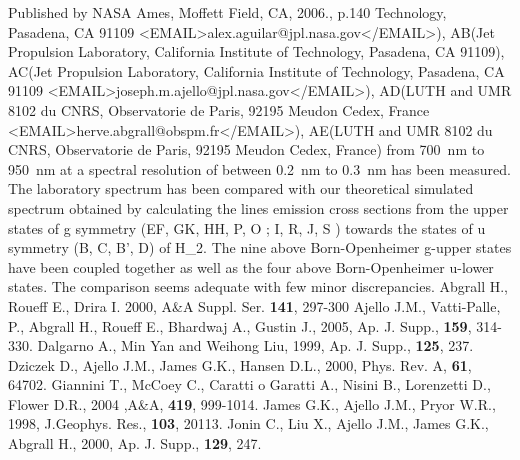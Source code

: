 {{{{{{{{{{{{{{\begin{references}
Published by NASA Ames, Moffett Field, CA, 2006., p.140
Technology, Pasadena, CA 91109 <EMAIL>alex.aguilar@jpl.nasa.gov</EMAIL>),
AB(Jet Propulsion Laboratory, California Institute of
Technology, Pasadena, CA 91109),
AC(Jet Propulsion Laboratory, California Institute of
Technology, Pasadena, CA 91109 <EMAIL>joseph.m.ajello@jpl.nasa.gov</EMAIL>),
AD(LUTH and UMR 8102 du CNRS, Observatorie de Paris, 92195
Meudon Cedex, France <EMAIL>herve.abgrall@obspm.fr</EMAIL>),
AE(LUTH and UMR 8102 du CNRS, Observatorie de Paris, 92195
Meudon Cedex, France)
from 700~nm to 950~nm at a spectral resolution of between 0.2~nm to
0.3~nm has been measured. The laboratory spectrum has been compared
with our theoretical simulated spectrum obtained by calculating the
lines emission cross sections from the upper states of g symmetry
(EF, GK, HH, P, O ; I, R, J, S ) towards the states of u symmetry
(B, C, B', D) of H_2. The nine above Born-Openheimer g-upper
states have been coupled together as well as the four above
Born-Openheimer u-lower states. The comparison seems adequate with
few minor discrepancies.
Abgrall H., Roueff E., Drira I. 2000, A\&A Suppl. Ser. \textbf{141}, 297-300
 Ajello J.M., Vatti-Palle, P., Abgrall H., Roueff E., Bhardwaj A., Gustin J., 2005, Ap. J. Supp., \textbf{159}, 314-330.
 Dalgarno A., Min Yan and Weihong Liu, 1999, Ap. J. Supp., \textbf{125}, 237.
 Dziczek D., Ajello J.M., James G.K., Hansen D.L., 2000, Phys. Rev. A, \textbf{61}, 64702.
 Giannini T., McCoey C., Caratti o Garatti A., Nisini B., Lorenzetti D., Flower D.R., 2004 ,A\&A, \textbf{419}, 999-1014.
 James G.K., Ajello J.M., Pryor W.R., 1998, J.Geophys. Res., \textbf{103}, 20113.
 Jonin C., Liu X., Ajello J.M., James G.K., Abgrall H., 2000, Ap. J. Supp., \textbf{129}, 247.

\end{references}}}}}}}}}}}}}}}
